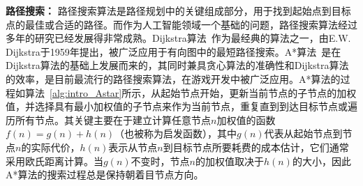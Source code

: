
\textbf{路径搜索：} 路径搜索算法是路径规划中的关键组成部分，用于找到起始点到目标点的最佳或合适的路径。而作为人工智能领域一个基础的问题，路径搜索算法经过多年的研究已经发展得非常成熟。Dijkstra算法~\cite{dijkstra1959note}作为最经典的算法之一，由E.W. Dijkstra于1959年提出，被广泛应用于有向图中的最短路径搜索。A*算法~\cite{hart1968formal}是在Dijkstra算法的基础上发展而来的，其同时兼具贪心算法的准确性和Dijkstra算法的效率，是目前最流行的路径搜索算法，在游戏开发中被广泛应用。A*算法的过程如算法~\ref{alg:intro_Astar}所示，从起始节点开始，更新当前节点的子节点的加权值，并选择具有最小加权值的子节点来作为当前节点，重复直到到达目标节点或遍历所有节点。其关键主要在于建立计算任意节点$n$加权值的函数$f(n)=g(n)+h(n)$（也被称为启发函数），其中$g(n)$代表从起始节点到节点$n$的实际代价，$h(n)$表示从节点$n$到目标节点所要耗费的成本估计，它们通常采用欧氏距离计算。当$g(n)$不变时，节点$n$的加权值取决于$h(n)$的大小，因此A*算法的搜索过程总是保持朝着目节点方向。


